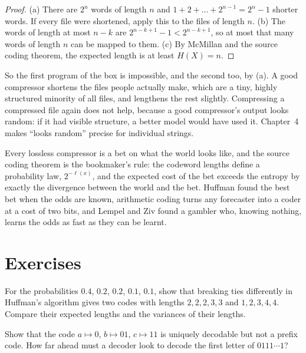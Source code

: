 \begin{proof}
(a) There are $2^n$ words of length $n$ and $1+2+\dots+2^{n-1}=2^n-1$ shorter words. If every file were shortened, apply this to the files of length $n$. (b) The words of length at most $n-k$ are $2^{n-k+1}-1<2^{n-k+1}$, so at most that many words of length $n$ can be mapped to them. (c) By McMillan and the source coding theorem, the expected length is at least $H(X)=n$.
\end{proof}

So the first program of the box is impossible, and the second too, by (a). A good compressor shortens the files people actually make, which are a tiny, highly structured minority of all files, and lengthens the rest slightly. Compressing a compressed file again does not help, because a good compressor's output looks random: if it had visible structure, a better model would have used it. Chapter~4 makes ``looks random'' precise for individual strings.

\begin{beauty}
Every lossless compressor is a bet on what the world looks like, and the source coding theorem is the bookmaker's rule: the codeword lengths define a probability law, $2^{-\ell(x)}$, and the expected cost of the bet exceeds the entropy by exactly the divergence between the world and the bet. Huffman found the best bet when the odds are known, arithmetic coding turns any forecaster into a coder at a cost of two bits, and Lempel and Ziv found a gambler who, knowing nothing, learns the odds as fast as they can be learnt.
\end{beauty}

\section{Exercises}

\begin{exercise}[$\star$]\label{ex:twohuffman}
For the probabilities $0.4$, $0.2$, $0.2$, $0.1$, $0.1$, show that breaking ties differently in Huffman's algorithm gives two codes with lengths $2,2,2,3,3$ and $1,2,3,4,4$. Compare their expected lengths and the variances of their lengths.
\end{exercise}

\begin{exercise}[$\star$]\label{ex:suffix}
Show that the code $a\mapsto0$, $b\mapsto01$, $c\mapsto11$ is uniquely decodable but not a prefix code. How far ahead must a decoder look to decode the first letter of $0111\cdots1$?
\end{exercise}

